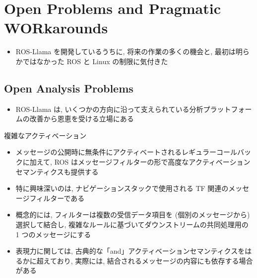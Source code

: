 
\section{Open Problems and Pragmatic WORkarounds}
\label{sec: open problems and pragmatic workarounds}

\begin{frame}{}
    \begin{itemize}
        \item ROS-Llama を開発しているうちに, 将来の作業の多くの機会と, 最初は明らかではなかった ROS と Linux の制限に気付きた
    \end{itemize}
\end{frame}


\subsection{Open Analysis Problems}
\label{ssec: Open Analysis Problems}

\begin{frame}{}
    \begin{itemize}
        \item ROS-Llama は, いくつかの方向に沿って支えられている分析プラットフォームの改善から恩恵を受ける立場にある
    \end{itemize}
\end{frame}

\begin{frame}{複雑なアクティベーション}
    \begin{itemize}
        \item メッセージの公開時に無条件にアクティベートされるレギュラーコールバックに加えて, ROS はメッセージフィルターの形で高度なアクティベーションセマンティクスも提供する
\item 特に興味深いのは, ナビゲーションスタックで使用される TF 関連のメッセージフィルターである
\item 概念的には, フィルターは複数の受信データ項目を (個別のメッセージから) 選択して結合し, 複雑なルールに基づいてダウンストリームの共同処理用の 1 つのメッセージにする
\item 表現力に関しては, 古典的な「and」アクティベーションセマンティクスをはるかに超えており, 実際には, 結合されるメッセージの内容にも依存する場合がある
    \end{itemize}
\end{frame}

